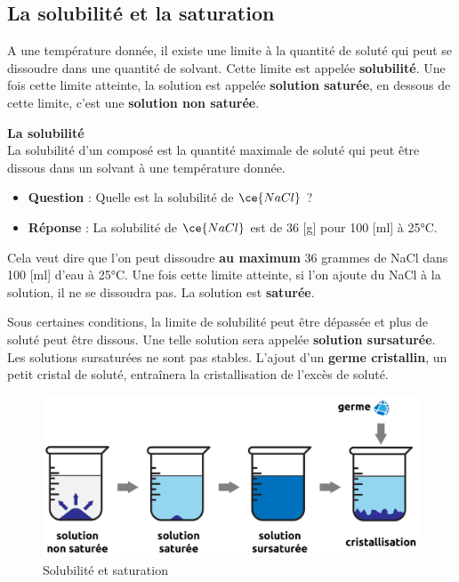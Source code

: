 \documentclass[
  11pt,
  a4paper,
  openany]{book}
\providecommand{\tightlist}{%
  \setlength{\itemsep}{0pt}\setlength{\parskip}{0pt}}
\begin{document}
\subsection{La solubilité et la saturation}\label{la-solubilituxe9-et-la-saturation}

A une température donnée, il existe une limite à la quantité de soluté qui peut se dissoudre dans une quantité de solvant. Cette limite est appelée \textbf{solubilité}. Une fois cette limite atteinte, la solution est appelée \textbf{solution saturée}, en dessous de cette limite, c'est une \textbf{solution non saturée}.

\begin{tcolorbox}
\textbf{La solubilité}\\
La solubilité d'un composé est la quantité maximale de soluté qui peut être dissous dans un solvant à une température donnée.

\end{tcolorbox}

\begin{itemize}
\tightlist
\item
  \textbf{Question} : Quelle est la solubilité de \(\ce{NaCl}\) ?
\item
  \textbf{Réponse} : La solubilité de \(\ce{NaCl}\) est de 36 {[}g{]} pour 100 {[}ml{]} à 25°C.
\end{itemize}

Cela veut dire que l'on peut dissoudre \textbf{au maximum} 36 grammes de NaCl dans 100 {[}ml{]} d'eau à 25°C. Une fois cette limite atteinte, si l'on ajoute du NaCl à la solution, il ne se dissoudra pas. La solution est \textbf{saturée}.

Sous certaines conditions, la limite de solubilité peut être dépassée et plus de soluté peut être dissous. Une telle solution sera appelée \textbf{solution sursaturée}. Les solutions sursaturées ne sont pas stables. L'ajout d'un \textbf{germe cristallin}, un petit cristal de soluté, entraînera la cristallisation de l'excès de soluté.

\begin{figure}

{\centering \includegraphics[width=0.67\linewidth]{images/solution} 

}

\caption{Solubilité et saturation}\label{fig:solubilite-saturation}
\end{figure}
\end{document}
